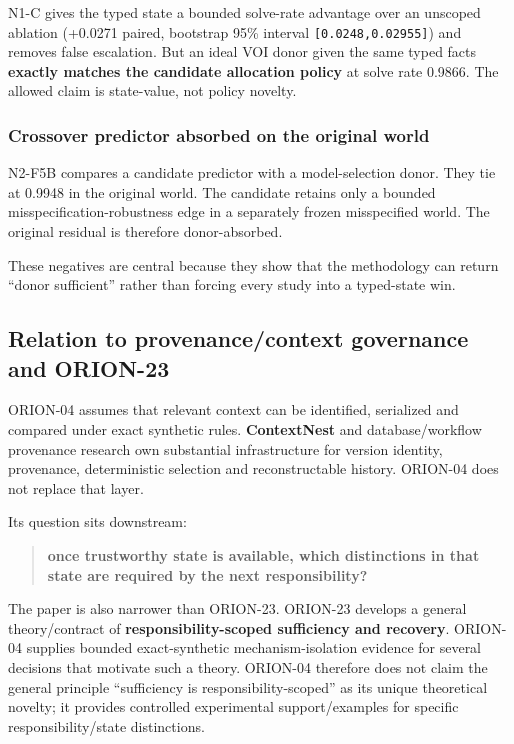 \documentclass[10pt]{article}
\begin{document}
N1-C gives the typed state a bounded solve-rate advantage over an
unscoped ablation (+0.0271 paired, bootstrap 95\% interval
\texttt{{[}0.0248,0.02955{]}}) and removes false escalation. But an
ideal VOI donor given the same typed facts \textbf{exactly matches the
candidate allocation policy} at solve rate 0.9866. The allowed claim is
state-value, not policy novelty.

\hypertarget{crossover-predictor-absorbed-on-the-original-world}{%
\subsubsection{Crossover predictor absorbed on the original
world}\label{crossover-predictor-absorbed-on-the-original-world}}

N2-F5B compares a candidate predictor with a model-selection donor. They
tie at 0.9948 in the original world. The candidate retains only a
bounded misspecification-robustness edge in a separately frozen
misspecified world. The original residual is therefore donor-absorbed.

These negatives are central because they show that the methodology can
return ``donor sufficient'' rather than forcing every study into a
typed-state win.

\hypertarget{relation-to-provenancecontext-governance-and-orion-23}{%
\subsection{Relation to provenance/context governance and
ORION-23}\label{relation-to-provenancecontext-governance-and-orion-23}}

ORION-04 assumes that relevant context can be identified, serialized and
compared under exact synthetic rules. \textbf{ContextNest} and
database/workflow provenance research own substantial infrastructure for
version identity, provenance, deterministic selection and
reconstructable history. ORION-04 does not replace that layer.

Its question sits downstream:

\begin{quote}
\textbf{once trustworthy state is available, which distinctions in that
state are required by the next responsibility?}
\end{quote}

The paper is also narrower than ORION-23. ORION-23 develops a general
theory/contract of \textbf{responsibility-scoped sufficiency and
recovery}. ORION-04 supplies bounded exact-synthetic mechanism-isolation
evidence for several decisions that motivate such a theory. ORION-04
therefore does not claim the general principle ``sufficiency is
responsibility-scoped'' as its unique theoretical novelty; it provides
controlled experimental support/examples for specific
responsibility/state distinctions.
\end{document}
